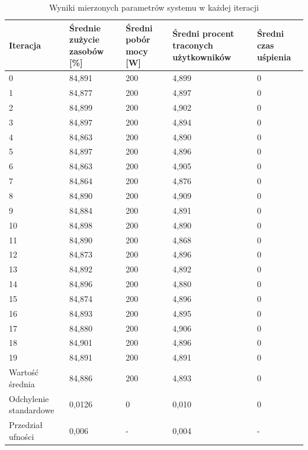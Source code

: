 \begin{table}[]
\renewcommand{\arraystretch}{1.5}
\centering
\caption{Wyniki mierzonych parametrów systemu w każdej iteracji}
\label{params_table}
\begin{tabular}{|p{}|p{}|p{}|p{}|p{}|}
\hline
Iteracja & Średnie zużycie zasobów [\%] & Średni pobór mocy [W] & Średni procent traconych użytkowników & Średni czas uśpienia \\ \hline
0 & 84,891 & 200 & 4,899 & 0 \\ \hline
1 & 84,877 & 200 & 4,897 & 0 \\ \hline
2 & 84,899 & 200 & 4,902 & 0 \\ \hline
3 & 84,897 & 200 & 4,894 & 0 \\ \hline
4 & 84,863 & 200 & 4,890 & 0 \\ \hline
5 & 84,897 & 200 & 4,896 & 0 \\ \hline
6 & 84,863 & 200 & 4,905 & 0 \\ \hline
7 & 84,864 & 200 & 4,876 & 0 \\ \hline
8 & 84,890 & 200 & 4,909 & 0 \\ \hline
9 & 84,884 & 200 & 4,891 & 0 \\ \hline
10 & 84,898 & 200 & 4,890 & 0 \\ \hline
11 & 84,890 & 200 & 4,868 & 0 \\ \hline
12 & 84,873 & 200 & 4,896 & 0 \\ \hline
13 & 84,892 & 200 & 4,892 & 0 \\ \hline
14 & 84,896 & 200 & 4,880 & 0 \\ \hline
15 & 84,874 & 200 & 4,896 & 0 \\ \hline
16 & 84,893 & 200 & 4,895 & 0 \\ \hline
17 & 84,880 & 200 & 4,906 & 0 \\ \hline
18 & 84,901 & 200 & 4,896 & 0 \\ \hline
19 & 84,891 & 200 & 4,891 & 0 \\ \hline
Wartość średnia & 84,886 & 200 & 4,893 & 0 \\ \hline
Odchylenie standardowe & 0,0126 & 0 & 0,010 & 0 \\ \hline
Przedział ufności & 0,006 & - & 0,004 & - \\ \hline
\end{tabular}
\end{table}

